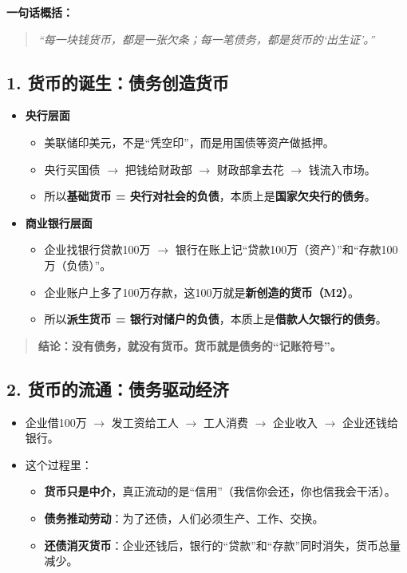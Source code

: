 \textbf{一句话概括：}

\begin{quote}
\emph{“每一块钱货币，都是一张欠条；每一笔债务，都是货币的‘出生证’。”}
\end{quote}

\subsection*{1. 货币的诞生：债务创造货币}

\begin{itemize}[nosep]
  \item \textbf{央行层面}
  \begin{itemize}
    \item 美联储印美元，不是“凭空印”，而是用国债等资产做抵押。
    \item 央行买国债 $\rightarrow$ 把钱给财政部 $\rightarrow$ 财政部拿去花 $\rightarrow$ 钱流入市场。
    \item 所以\textbf{基础货币 = 央行对社会的负债}，本质上是\textbf{国家欠央行的债务}。
  \end{itemize}

  \item \textbf{商业银行层面}
  \begin{itemize}
    \item 企业找银行贷款100万 $\rightarrow$ 银行在账上记“贷款100万（资产）”和“存款100万（负债）”。
    \item 企业账户上多了100万存款，这100万就是\textbf{新创造的货币（M2）}。
    \item 所以\textbf{派生货币 = 银行对储户的负债}，本质上是\textbf{借款人欠银行的债务}。
  \end{itemize}
\end{itemize}

\begin{quote}
\textbf{结论：没有债务，就没有货币。货币就是债务的“记账符号”。}
\end{quote}

\subsection*{2. 货币的流通：债务驱动经济}

\begin{itemize}[nosep]
  \item 企业借100万 $\rightarrow$ 发工资给工人 $\rightarrow$ 工人消费 $\rightarrow$ 企业收入 $\rightarrow$ 企业还钱给银行。
  \item 这个过程里：
  \begin{itemize}
    \item \textbf{货币只是中介}，真正流动的是“信用”（我信你会还，你也信我会干活）。
    \item \textbf{债务推动劳动}：为了还债，人们必须生产、工作、交换。
    \item \textbf{还债消灭货币}：企业还钱后，银行的“贷款”和“存款”同时消失，货币总量减少。
  \end{itemize}
\end{itemize}

